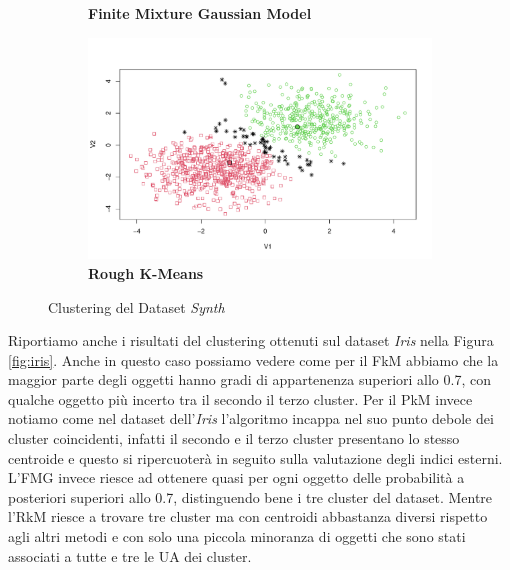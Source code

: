 \documentclass[12pt]{article}
\begin{document}
\begin{figure}[h]
\begin{subfigure}[h]{0.49\textwidth}
		\caption{\textbf{Finite Mixture Gaussian Model}}
		\label{fig:synth_mclust}
	\end{subfigure}
	\begin{subfigure}[h]{0.49\textwidth}
		\centering
		\includegraphics[width=\textwidth]{synth_rkm}
		\caption{\textbf{Rough K-Means}}
		\label{fig:synth_rkm}
	\end{subfigure}
	\caption{Clustering del Dataset \textit{Synth}}
	\label{fig:synth}
\end{figure}

Riportiamo anche i risultati del clustering ottenuti sul dataset \textit{Iris} nella Figura \ref{fig:iris}. Anche in questo caso possiamo vedere come per il FkM abbiamo che la maggior parte degli oggetti hanno gradi di appartenenza superiori allo 0.7, con qualche oggetto più incerto tra il secondo il terzo cluster. Per il PkM invece notiamo come nel dataset dell'\textit{Iris} l'algoritmo incappa nel suo punto debole dei cluster coincidenti, infatti il secondo e il terzo cluster presentano lo stesso centroide e questo si ripercuoterà in seguito sulla valutazione degli indici esterni. L'FMG invece riesce ad ottenere quasi per ogni oggetto delle probabilità a posteriori superiori allo 0.7, distinguendo bene i tre cluster del dataset. Mentre l'RkM riesce a trovare tre cluster ma con centroidi abbastanza diversi rispetto agli altri metodi e con solo una piccola minoranza di oggetti che sono stati associati a tutte e tre le UA dei cluster.
\end{document}
